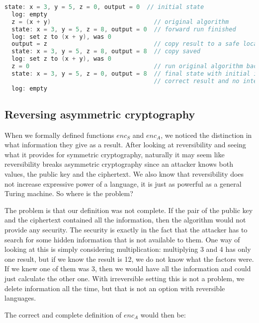 \documentclass[a4paper,10pt,openright]{memoir}
\def\enc{\ensuremath{\mathit{enc}}}
\begin{document}
\begin{lstlisting}[language=c]
  state: x = 3, y = 5, z = 0, output = 0  // initial state
  log: empty
  z = (x + y)                             // original algorithm
  state: x = 3, y = 5, z = 8, output = 0  // forward run finished
  log: set z to (x + y), was 0
  output = z                              // copy result to a safe location, log ignored
  state: x = 3, y = 5, z = 8, output = 8  // copy saved
  log: set z to (x + y), was 0
  z = 0                                   // run original algorithm backwards
  state: x = 3, y = 5, z = 0, output = 8  // final state with initial input values, 
                                          // correct result and no intermediate values
  log: empty
\end{lstlisting}




\subsection{Reversing asymmetric cryptography}
\label{sec:asym_rev}

When we formally defined functions $\enc_S$ and $\enc_A$, we noticed 
the distinction in what information they give as a result. After 
looking at reversibility and seeing what it provides for symmetric 
cryptography, naturally it may seem like reversibility breaks 
asymmetric cryptography since an attacker knows both values, the public 
key and the ciphertext. We also know that reversibility does not 
increase expressive power of a language, it is just as powerful as a 
general Turing machine. So where is the problem?

The problem is that our definition was not complete. If the pair of the 
public key and the ciphertext contained all the information, then the 
algorithm would not provide any security. The security is exactly in 
the fact that the attacker has to search for some hidden information 
that is not available to them. One way of looking at this is simply 
considering multiplication: multiplying 3 and 4 has only one result, 
but if we know the result is 12, we do not know what the factors were. 
If we knew one of them was 3, then we would have all the information 
and could just calculate the other one. With irreversible setting this 
is not a problem, we delete information all the time, but that is not 
an option with reversible languages.

The correct and complete definition of $\enc_A$ would then be:
\end{document}
